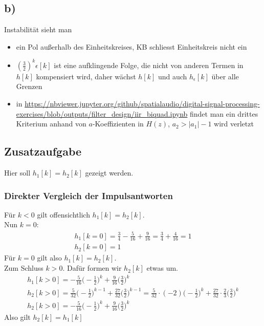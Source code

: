 \documentclass[11pt,a4paper,DIV=12]{scrartcl}
\begin{document}
\subsection*{b)}
Instabilität sieht man
\begin{itemize}
	\item ein Pol außerhalb des Einheitskreises, KB schliesst Einheitskreis nicht ein
	\item $\left(\frac{3}{2}\right)^k \epsilon[k]$ ist eine aufklingende Folge, die nicht von anderen Termen in $h[k]$ kompensiert wird, daher wächst $h[k]$ und auch $h_\epsilon[k]$ über alle Grenzen
	\item in \url{https://nbviewer.jupyter.org/github/spatialaudio/digital-signal-processing-exercises/blob/outputs/filter_design/iir_biquad.ipynb}
	findet man ein drittes Kriterium anhand von $a$-Koeffizienten in $H(z)$, $a_2>|a_1|-1$ wird verletzt
\end{itemize}
\newpage
\subsection*{Zusatzaufgabe}
Hier soll $h_1[k]=h_2[k]$ gezeigt werden.
\subsubsection*{Direkter Vergleich der Impulsantworten}
Für $k<0$ gilt offensichtlich $h_1[k]=h_2[k]$.\\
Nun $k=0$:
\begin{gather}
	h_1[k=0]=\frac{3}{4}-\frac{5}{16}+\frac{9}{16}=\frac{3}{4}+\frac{4}{16}=1\\
	h_2[k=0]=1
\end{gather}
Für $k=0$ gilt also $h_1[k]=h_2[k]$.\\
Zum Schluss $k>0$. Dafür formen wir $h_2[k]$ etwas um.
\begin{gather}
	h_1[k>0]=-\frac{5}{16}\bigg (-\frac{1}{2}\bigg )^k+\frac{9}{16}\bigg (\frac{3}{2}\bigg )^k\\
	h_2[k>0]=\frac{5}{32}\bigg (-\frac{1}{2}\bigg )^{k-1}+\frac{27}{32}\bigg (\frac{3}{2}\bigg )^{k-1}=\frac{5}{32}\cdot(-2)\bigg (-\frac{1}{2}\bigg )^k+\frac{27}{32}\cdot\frac{2}{3}\bigg (\frac{3}{2}\bigg )^k\\
	h_2[k>0]=-\frac{5}{16}\bigg (-\frac{1}{2}\bigg )^k+\frac{9}{16}\bigg (\frac{3}{2}\bigg )^k
\end{gather}
Also gilt $h_2[k]=h_1[k]$
\end{document}
